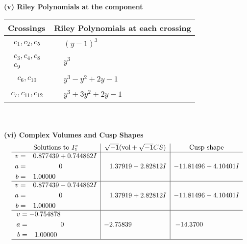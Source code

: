 \documentclass[1p]{elsarticle_modified}
\theoremstyle{definition}
\newcommand{\I}{\sqrt{-1}}
\begin{document}
\newpage\renewcommand{\arraystretch}{1}
\flushleft \textbf{(v) Riley Polynomials at the component}\newline \\
\begin{tabular}{m{50pt}|m{274pt}}
Crossings & \hspace{64pt}Riley Polynomials at each crossing \\
\hline $$\begin{aligned}c_{1},c_{2},c_{5}\end{aligned}$$&$\begin{aligned}
&(y-1)^3
\end{aligned}$\\
\hline $$\begin{aligned}c_{3},c_{4},c_{8}\\c_{9}\end{aligned}$$&$\begin{aligned}
&y^3
\end{aligned}$\\
\hline $$\begin{aligned}c_{6},c_{10}\end{aligned}$$&$\begin{aligned}
&y^3- y^2+2 y-1
\end{aligned}$\\
\hline $$\begin{aligned}c_{7},c_{11},c_{12}\end{aligned}$$&$\begin{aligned}
&y^3+3 y^2+2 y-1
\end{aligned}$\\
\hline
\end{tabular}\\~\\
\newpage\flushleft \textbf{(vi) Complex Volumes and Cusp Shapes}
$$\begin{array}{c|c|c}  
\text{Solutions to }I^v_{1}& \I (\text{vol} + \sqrt{-1}CS) & \text{Cusp shape}\\
 \hline 
\begin{aligned}
v &= \phantom{-}0.877439 + 0.744862 I \\
a &= \phantom{-0.000000 } 0 \\
b &= \phantom{-}1.00000\phantom{ +0.000000I}\end{aligned}
 & \phantom{-}1.37919 - 2.82812 I & -11.81496 + 4.10401 I \\ \hline\begin{aligned}
v &= \phantom{-}0.877439 - 0.744862 I \\
a &= \phantom{-0.000000 } 0 \\
b &= \phantom{-}1.00000\phantom{ +0.000000I}\end{aligned}
 & \phantom{-}1.37919 + 2.82812 I & -11.81496 - 4.10401 I \\ \hline\begin{aligned}
v &= -0.754878\phantom{ +0.000000I} \\
a &= \phantom{-0.000000 } 0 \\
b &= \phantom{-}1.00000\phantom{ +0.000000I}\end{aligned}
 & -2.75839\phantom{ +0.000000I} & -14.3700\phantom{ +0.000000I}\\
 \hline 
 \end{array}$$\newpage
\end{document}
